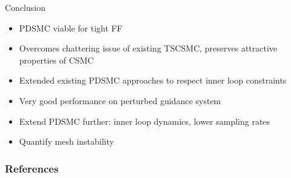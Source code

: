\documentclass[12pt,svgnames,table,draft=false]{beamer}
\begin{document}
\begin{frame}{Conclusion}

\begin{tcolorbox}[width=.99\textwidth,
colback={blue!10!},
standard jigsaw,
opacityback=1,  %
]  
\begin{itemize}
\item PDSMC viable for tight FF
\item Overcomes chattering issue of existing TSCSMC, preserves attractive properties of CSMC
\item Extended existing PDSMC approaches to respect inner loop constraints \cite{Bolting2016}
\item Very good performance on perturbed guidance system
\end{itemize}
\end{tcolorbox}

\begin{tcolorbox}[width=.99\textwidth,
colback={red!10!},
standard jigsaw,
opacityback=1,  %
]  
\begin{itemize}
\item Extend PDSMC further: inner loop dynamics, lower sampling rates
\item Quantify mesh instability
\end{itemize}
\end{tcolorbox}

\end{frame}


\begin{frame}
\end{frame}

\usebackgroundtemplate{}

\frametitle{References}


        
%  
\end{document}
